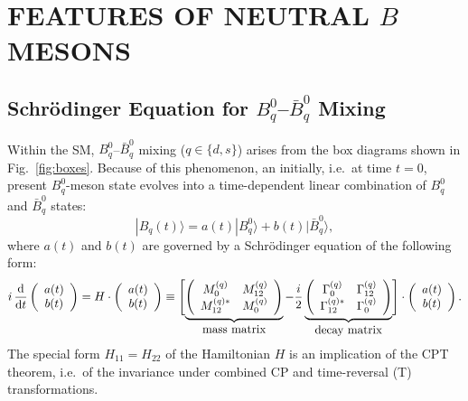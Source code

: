 \documentclass[11pt]{cernrep}
\begin{document}
\section{FEATURES OF NEUTRAL {\boldmath$B$\unboldmath} 
MESONS}\label{sec:mix}
\setcounter{equation}{0}
%
%
%
\boldmath\subsection{Schr\"odinger Equation for $B^0_q$--$\bar B^0_q$ 
Mixing}\unboldmath\label{ssec:BBbar-mix}
%
%
%
Within the SM, $B^0_q$--$\bar B^0_q$ mixing ($q\in\{d,s\}$) arises from
the box diagrams shown in Fig.~\ref{fig:boxes}. Because of
this phenomenon, an initially, i.e.\ at time $t=0$, present 
$B^0_q$-meson state evolves into a time-dependent linear combination of 
$B^0_q$ and $\bar B^0_q$ states:
\begin{equation}
|B_q(t)\rangle=a(t)|B^0_q\rangle + b(t)|\bar B^0_q\rangle,
\end{equation}
where $a(t)$ and $b(t)$ are governed by a Schr\"odinger equation of 
the following form:
\begin{equation}\label{SG-OSZ}
i\,\frac{{\rm d}}{{\rm d} t}\left(\begin{array}{c} a(t)\\ b(t)
\end{array}
\right)= H \cdot\left(\begin{array}{c}
a(t)\\ b(t)\nonumber
\end{array}
\right) \equiv
\Biggl[\underbrace{\left(\begin{array}{cc}
M_{0}^{(q)} & M_{12}^{(q)}\\ M_{12}^{(q)\ast} & M_{0}^{(q)}
\end{array}\right)}_{\mbox{mass matrix}}-
\frac{i}{2}\underbrace{\left(\begin{array}{cc}
\Gamma_{0}^{(q)} & \Gamma_{12}^{(q)}\\
\Gamma_{12}^{(q)\ast} & \Gamma_{0}^{(q)}
\end{array}\right)}_{\mbox{decay matrix}}\Biggr]
\cdot\left(\begin{array}{c}
a(t)\\ b(t)\nonumber
\end{array}
\right).
\end{equation}
The special form $H_{11}=H_{22}$ of the Hamiltonian $H$ is an implication 
of the CPT theorem, i.e.\ of the invariance under combined CP and 
time-reversal (T) transformations. 
\end{document}
